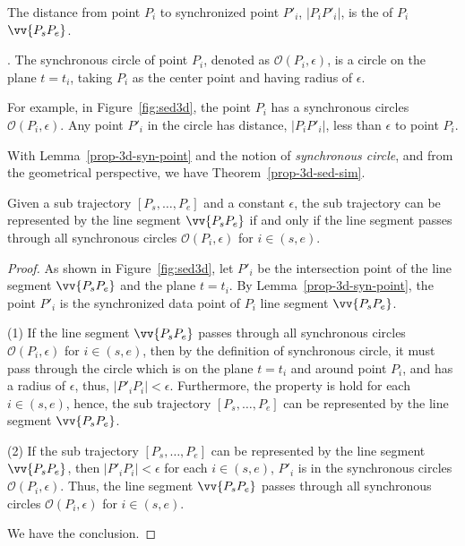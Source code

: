 The distance from point $P_i$ to synchronized point $P'_i$, $|P_iP'_i|$, is the \sed of $P_i$ \wrt $\vv{P_sP_e}$.

. The synchronous circle of point $P_i$, denoted as $\mathcal{O}(P_i, \epsilon)$, is a circle on the plane $t=t_i$, taking $P_i$ as the center point and having radius of $\epsilon$. %

For example, in Figure~\ref{fig:sed3d}, the point $P_i$ has a synchronous circles $\mathcal{O}(P_i, \epsilon)$. Any point $P'_i$ in the circle has distance, \ie $|P_iP'_i|$, less than $\epsilon$ to point $P_i$. 

With Lemma~\ref{prop-3d-syn-point} and the notion of \emph{synchronous circle}, and from the geometrical perspective, we have Theorem~\ref{prop-3d-sed-sim}.

\begin{theorem}
\label{prop-3d-sed-sim}
Given a sub trajectory $[P_s, \ldots, P_e]$ and a constant $\epsilon$, the sub trajectory can be represented by the line segment $\vv{P_sP_e}$ if and only if the line segment passes through all synchronous circles $\mathcal{O}(P_i, \epsilon)$ for $i \in (s, e)$.
\end{theorem}

\begin{proof}
As shown in Figure~\ref{fig:sed3d}, let $P'_i$ be the intersection point of the line segment $\vv{P_sP_e}$ and the plane $t=t_i$.
By Lemma~\ref{prop-3d-syn-point}, the point $P'_i$ is the synchronized data point of $P_i$ \wrt line segment $\vv{P_sP_e}$.

(1) If the line segment $\vv{P_sP_e}$ passes through all synchronous circles $\mathcal{O}(P_i, \epsilon)$ for $i \in (s, e)$, then by the definition of synchronous circle, it must pass through the circle which is on the plane $t=t_i$ and around point $P_i$, and has a radius of $\epsilon$, thus, $|P'_iP_i| <\epsilon$. Furthermore, the property is hold for each $i \in (s, e)$, hence, the sub trajectory $[P_s, \ldots, P_e]$ can be represented by the line segment $\vv{P_sP_e}$.

(2) If the sub trajectory $[P_s, \ldots, P_e]$ can be represented by the line segment $\vv{P_sP_e}$, then $|P'_iP_i| <\epsilon$ for each $i \in (s, e)$, \ie $P'_i$ is in the synchronous circles $\mathcal{O}(P_i, \epsilon)$. Thus, the line segment $\vv{P_sP_e}$ passes through all synchronous circles $\mathcal{O}(P_i, \epsilon)$ for $i \in (s, e)$.

We have the conclusion.
\end{proof}


